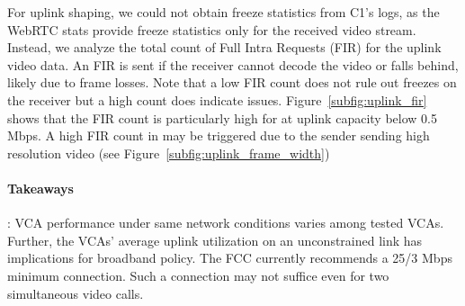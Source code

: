 For uplink shaping, we could not obtain freeze statistics from C1's logs, as the WebRTC stats provide freeze statistics only for the received video stream. Instead, we analyze the total count of Full Intra Requests (FIR) for the uplink video data. An FIR is sent if the receiver cannot decode the video or falls behind, likely due to frame losses. Note that a low FIR count does not rule out freezes on the receiver but a high count does indicate issues. Figure~\ref{subfig:uplink_fir} shows that the FIR count is particularly high for \teamsbrowser at uplink capacity below 0.5 Mbps. A high FIR count in \teamsbrowser may be triggered due to the sender sending high resolution video (see Figure~\ref{subfig:uplink_frame_width})



\begin{mdframed}[roundcorner=5pt, backgroundcolor=black!10]
\paragraph{Takeaways}: VCA performance under same network conditions varies among tested VCAs. Further, the VCAs' average uplink utilization on an unconstrained link has implications for broadband policy. The FCC currently recommends a 25/3 Mbps minimum connection. Such a connection may not suffice even for two simultaneous video calls. 
\end{mdframed}








